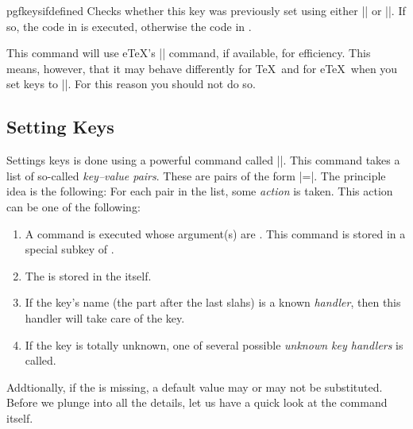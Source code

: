 %

\begin{docCommand}{pgfkeysifdefined}{}{}
  Checks whether this key was previously set using either
  |\pgfkeyssetvalue| or |\pgfkeyslet|. If so, the code in  is
  executed, otherwise the code in .

  This command will use e\TeX's |\ifcsname| command, if available, for
  efficiency. This means, however, that it may behave differently for
  \TeX\ and for e\TeX\ when you set keys to |\relax|. For this reason
  you should not do so. 

\begin{codeexample}[]
\end{codeexample}
\end{docCommand}



\subsection{Setting Keys}{ }

Settings keys is done using a powerful command called |\pgfkeys|. This
command takes a list of so-called \emph{key--value pairs}. These are
pairs of the form |=|. The principle idea is the
following: For each pair in the list, some \emph{action} is
taken. This action can be one of the following:

\begin{enumerate}
\item A command is executed whose argument(s) are . This
  command is stored in a special subkey of .
\item The  is stored in the  itself.
\item If the key's name (the part after the last slahs) is a known
  \emph{handler}, then this handler will take care of the key.
\item If the key is totally unknown, one of several possible
  \emph{unknown key handlers} is called. 
\end{enumerate}

Addtionally, if the  is missing, a default value may or
may not be substituted. Before we plunge into all the details,
let us have a quick look at the command itself.

